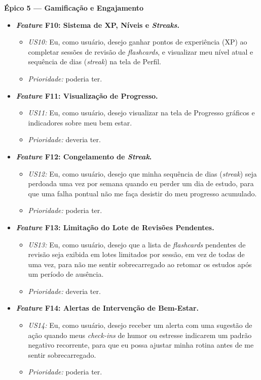 \textbf{Épico 5 --- Gamificação e Engajamento}

\begin{itemize}
    \item \textbf{\textit{Feature} F10: Sistema de XP, Níveis e \textit{Streaks}.}
    \begin{itemize}
        \item \textit{US10:} Eu, como usuário, desejo ganhar pontos de experiência (XP) ao completar sessões de revisão de \textit{flashcards}, e visualizar meu nível atual e sequência de dias (\textit{streak}) na tela de Perfil.
        \item \textit{Prioridade:} poderia ter.
    \end{itemize}
    \item \textbf{\textit{Feature} F11: Visualização de Progresso.}
    \begin{itemize}
        \item \textit{US11:} Eu, como usuário, desejo visualizar na tela de Progresso gráficos e indicadores sobre meu bem estar.
        \item \textit{Prioridade:} deveria ter.
    \end{itemize}
    \item \textbf{\textit{Feature} F12: Congelamento de \textit{Streak}.}
    \begin{itemize}
        \item \textit{US12:} Eu, como usuário, desejo que minha sequência de dias (\textit{streak}) seja perdoada uma vez por semana quando eu perder um dia de estudo, para que uma falha pontual não me faça desistir do meu progresso acumulado.
        \item \textit{Prioridade:} poderia ter.
    \end{itemize}
    \item \textbf{\textit{Feature} F13: Limitação do Lote de Revisões Pendentes.}
    \begin{itemize}
        \item \textit{US13:} Eu, como usuário, desejo que a lista de \textit{flashcards} pendentes de revisão seja exibida em lotes limitados por sessão, em vez de todas de uma vez, para não me sentir sobrecarregado ao retomar os estudos após um período de ausência.
        \item \textit{Prioridade:} deveria ter.
    \end{itemize}
    \item \textbf{\textit{Feature} F14: Alertas de Intervenção de Bem-Estar.}
    \begin{itemize}
        \item \textit{US14:} Eu, como usuário, desejo receber um alerta com uma sugestão de ação quando meus \textit{check-ins} de humor ou estresse indicarem um padrão negativo recorrente, para que eu possa ajustar minha rotina antes de me sentir sobrecarregado.
        \item \textit{Prioridade:} poderia ter.
    \end{itemize}
\end{itemize}

